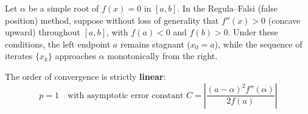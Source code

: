 \begin{theorembox}[Linear Convergence of the Regula--Falsi Method ($p = 1$)]
Let $\alpha$ be a simple root of $f(x) = 0$ in $[a, b]$. In the Regula--Falsi (false position) method, suppose without loss of generality that $f''(x) > 0$ (concave upward) throughout $[a, b]$, with $f(a) < 0$ and $f(b) > 0$. Under these conditions, the left endpoint $a$ remains stagnant ($x_0 = a$), while the sequence of iterates $\{x_k\}$ approaches $\alpha$ monotonically from the right.

The order of convergence is strictly \textbf{linear}:
\begin{equation}
    \boxed{p = 1} \quad \text{with asymptotic error constant } C = \left| \frac{(a - \alpha)^2 f''(\alpha)}{2 f(a)} \right|
\end{equation}
\end{theorembox}


